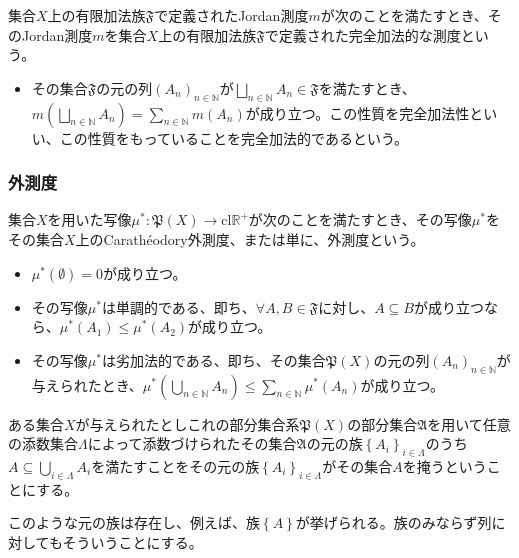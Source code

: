 \documentclass[dvipdfmx]{jsarticle}
\begin{document}
\begin{dfn}
集合$X$上の有限加法族$\mathfrak{F}$で定義されたJordan測度$m$が次のことを満たすとき、そのJordan測度$m$を集合$X$上の有限加法族$\mathfrak{F}$で定義された完全加法的な測度という。
\begin{itemize}
\item
  その集合$\mathfrak{F}$の元の列$\left( A_{n} \right)_{n \in \mathbb{N}}$が$\bigsqcup_{n \in \mathbb{N}} A_{n}\in \mathfrak{F}$を満たすとき、$m\left( \bigsqcup_{n \in \mathbb{N}} A_{n} \right) = \sum_{n \in \mathbb{N}} {m\left( A_{n} \right)}$が成り立つ。この性質を完全加法性といい、この性質をもっていることを完全加法的であるという。
\end{itemize}
\end{dfn}
\subsubsection{外測度}%
\begin{axs}[外測度の公理]
集合$X$を用いた写像$\mu^{*}\mathfrak{:P}(X) \rightarrow \mathrm{cl}\mathbb{R}^{+}$が次のことを満たすとき、その写像$\mu^{*}$をその集合$X$上のCarathéodory外測度、または単に、外測度という。
\begin{itemize}
\item
  $\mu^{*}(\emptyset) = 0$が成り立つ。
\item
  その写像$\mu^{*}$は単調的である、即ち、$\forall A,B \in \mathfrak{F}$に対し、$A \subseteq B$が成り立つなら、$\mu^{*}\left( A_{1} \right) \leq \mu^{*}\left( A_{2} \right)$が成り立つ。
\item
  その写像$\mu^{*}$は劣加法的である、即ち、その集合$\mathfrak{P}(X)$の元の列$\left( A_{n} \right)_{n \in \mathbb{N}}$が与えられたとき、$\mu^{*}\left( \bigcup_{n \in \mathbb{N}} A_{n} \right) \leq \sum_{n \in \mathbb{N}} {\mu^{*}\left( A_{n} \right)}$が成り立つ。
\end{itemize}
\end{axs}
\begin{dfn}
ある集合$X$が与えられたとしこれの部分集合系$\mathfrak{P}(X)$の部分集合$\mathfrak{A}$を用いて任意の添数集合$\varLambda$によって添数づけられたその集合$\mathfrak{A}$の元の族$\left\{ A_{i} \right\}_{i \in \varLambda}$のうち$A \subseteq \bigcup_{i \in \varLambda} A_{i}$を満たすことをその元の族$\left\{ A_{i} \right\}_{i \in \varLambda}$がその集合$A$を掩うということにする。
\end{dfn}\par
このような元の族は存在し、例えば、族$\left\{ A \right\}$が挙げられる。族のみならず列に対してもそういうことにする。
\end{document}

